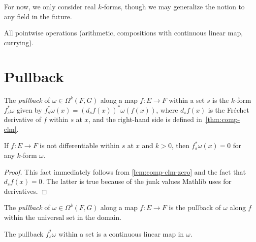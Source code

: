 For now, we only consider real \(k\)-forms, though we may generalize the notion to any field in the future.

All pointwise operations (arithmetic, compositions with continuous linear map, currying).

\section{Pullback}%
\label{sec:pullback}

\begin{definition}%
  \label{def:pullback-within}
  The \emph{pullback} of \(\omega\in \Omega^{k}(F, G)\) along a map \(f\colon E\to F\) within a set \(s\)
  is the \(k\)-form \(f_{s}^{*}\omega\) given by \(f_{s}^{*}\omega(x) = {(d_{s}f(x))}^{*}\omega(f(x))\),
  where \(d_{s}f(x)\) is the Fréchet derivative of \(f\) within \(s\) at \(x\),
  and the right-hand side is defined in~\autoref{thm:comp-clm}.
\end{definition}

\begin{lemma}%
  \label{lem:pullback-within-of-non-diff}
  If \(f\colon E\to F\) is not differentiable within \(s\) at \(x\) and \(k > 0\),
  then \(f_{s}^{*}\omega(x)=0\) for any \(k\)-form \(\omega\).
\end{lemma}
\begin{proof}
  This fact immediately follows from \autoref{lem:comp-clm-zero} and the fact that \(d_{s}f(x)=0\).
  The latter is true because of the junk values Mathlib uses for derivatives.
\end{proof}

\begin{definition}%
  \label{def:pullback-space}
  The \emph{pullback} of \(\omega\in \Omega^{k}(F, G)\) along a map \(f\colon E\to F\)
  is the pullback of \(\omega\) along \(f\) within the universal set in the domain.
\end{definition}

\begin{theorem}%
  \label{thm:pullback-within-as-clm}
  The pullback \(f_{s}^{*}\omega\) within a set is a continuous linear map in \(\omega\).
\end{theorem}

